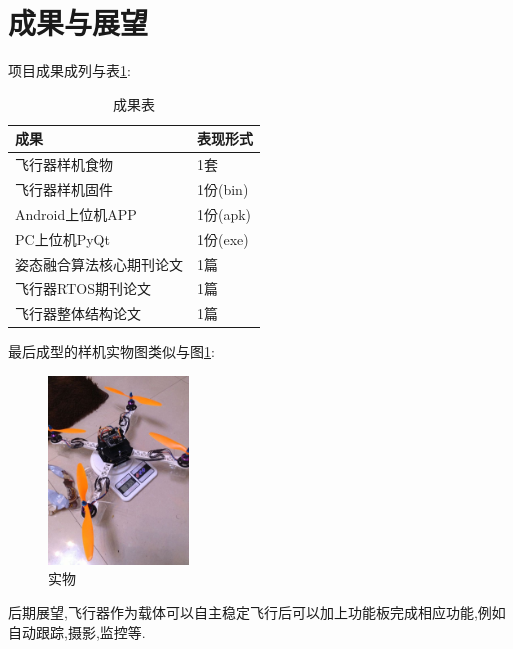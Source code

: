 \documentclass[10pt,a4paper]{article}
\begin{document}
\section{成果与展望} 
项目成果成列与表\ref{成果表}:
\begin{table}[!hbp]
\begin{center}
    \begin{tabular}{|l|l|}
        \hline
        成果 & 表现形式 \\
        \hline
        飞行器样机食物 & 1套 \\
        \hline
        飞行器样机固件 & 1份(bin) \\
        \hline
        Android上位机APP & 1份(apk) \\
        \hline
        PC上位机PyQt & 1份(exe) \\
        \hline
        姿态融合算法核心期刊论文 & 1篇 \\
        \hline
        飞行器RTOS期刊论文 & 1篇 \\
        \hline
        飞行器整体结构论文 & 1篇 \\
        \hline
    \end{tabular}\caption{成果表\label{成果表}}
\end{center}
\end{table}

最后成型的样机实物图类似与图\ref{实物}:
\begin{figure}[!hbp]
    \begin{center}
        \includegraphics[height=5cm]{实物.jpg}
        \caption{实物}\label{实物}
    \end{center}
\end{figure}
后期展望,飞行器作为载体可以自主稳定飞行后可以加上功能板完成相应功能,例如自动跟踪,摄影,监控等.

\newpage
\renewcommand\refname{参考文献}
\centering %


\end{document}
